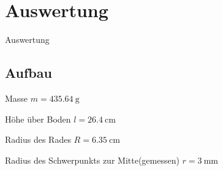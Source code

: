 \section{Auswertung}
\begin{frame}{Auswertung}
    
    \subsection{Aufbau}
    Masse $m = \SI{435.64}{\gram}$

    Höhe über Boden $l= \SI{26.4}{\centi\meter}$
    
    Radius des Rades $R =\SI{6.35}{\centi\meter}$
    
    Radius des Schwerpunkts zur Mitte(gemessen) $r= \SI{3}{\milli\meter}$

\end{frame}




